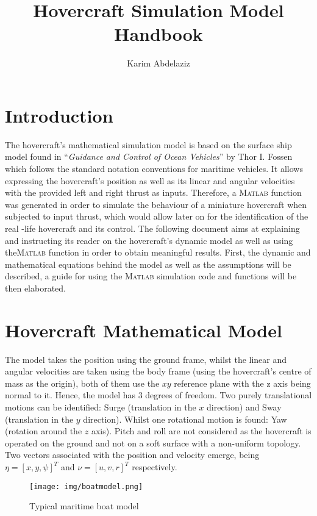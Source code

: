 \documentclass[a4paper,12pt]{article}
\title{Hovercraft Simulation Model Handbook}
\author{Karim Abdelaziz}
\begin{document}


\section{Introduction}

The hovercraft’s mathematical simulation model is based on the surface ship model found in “\textit{Guidance and Control of Ocean Vehicles}” by Thor I. Fossen which follows the standard notation conventions for maritime vehicles. It allows expressing the hovercraft’s position as well as its linear and angular velocities with the provided left and right thrust as inputs. Therefore, a \textsc{Matlab} function was generated in order to simulate the behaviour of a miniature hovercraft when subjected to input thrust, which would allow later on for the identification of the real -life hovercraft and its control. The following document aims at explaining and instructing its reader on the hovercraft's dynamic model as well as using the\textsc{Matlab} function in order to obtain meaningful results. First, the dynamic and mathematical equations behind the model as well as the assumptions will be described, a guide for using the \textsc{Matlab} simulation code and functions will be then elaborated.\\


\section{Hovercraft Mathematical Model}

The model takes the position using the ground frame, whilst the linear and angular velocities are taken using the body frame (using the hovercraft’s centre of mass as the origin), both of them use the \(xy\) reference plane with the z axis being normal to it. Hence, the model has 3 degrees of freedom. Two purely translational motions can be identified: Surge (translation in the \(x\) direction) and Sway (translation in the \(y\) direction). Whilst one rotational motion is found: Yaw (rotation around the \(z\) axis). Pitch and roll are not considered as the hovercraft is operated on the ground and not on a soft surface with a non-uniform topology. Two vectors associated with the position and velocity emerge, being \(\eta=[x,y,\psi]^T\) and \(\nu =[u,v,r]^T\) respectively.

\begin{figure}[h] %
    \centering
    \texttt{[image: img/boatmodel.png]} 
    \caption{Typical maritime boat model}
\end{figure}
\end{document}
